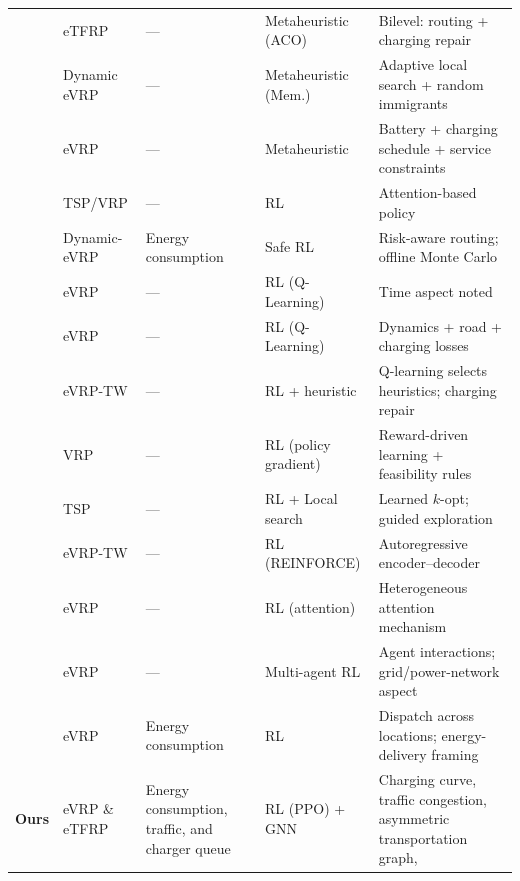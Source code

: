 \documentclass[a4paper,fleqn]{cas-sc}
\begin{document}
\begin{table}
\begin{tabular}{p{0.5cm}p{1.8cm}p{3.0cm}p{2.5cm}p{7cm}}
\cite{9409782} &
eTFRP &
--- &
Metaheuristic (ACO) &
Bilevel: routing + charging repair \\



\cite{https://doi.org/10.1155/2021/6635749} &
Dynamic eVRP &
--- &
Metaheuristic (Mem.) &
Adaptive local search + random immigrants \\


\cite{https://doi.org/10.1049/pel2.12555} &
eVRP &
--- &
Metaheuristic &
Battery + charging schedule + service constraints \\

\midrule
\cite{kool2018attention} &
TSP/VRP &
--- &
RL&
Attention-based policy \\



\cite{BASSO2022102496} &
Dynamic-eVRP &
Energy consumption &
Safe RL &
Risk-aware routing; offline Monte Carlo \\



\cite{lin2025} &
eVRP&
--- &
RL (Q-Learning) &
Time aspect noted \\

\cite{TANG2023121711} &
eVRP &
--- &
RL (Q-Learning)&
Dynamics + road + charging losses \\

\cite{lin2022} &
eVRP-TW &
--- &
RL + heuristic &
Q-learning selects heuristics; charging repair \\

\cite{NEURIPS2018_9fb4651c} &
VRP &
--- &
RL (policy gradient) &
Reward-driven learning + feasibility rules \\

\cite{NEURIPS2023_9bae70d3} &
TSP &
--- &
RL + Local search &
Learned $k$-opt; guided exploration \\

\cite{10608117} &
eVRP-TW &
--- &
RL (REINFORCE) &
Autoregressive encoder--decoder \\

\cite{11016767} &
eVRP &
--- &
RL (attention) &
Heterogeneous attention mechanism \\

\cite{10310266} &
eVRP &
--- &
Multi-agent RL &
Agent interactions; grid/power-network aspect \\

\cite{ALQAHTANI2022122626} &
eVRP &
Energy consumption &
RL&
Dispatch across locations; energy-delivery framing \\

\midrule
\textbf{Ours} &
eVRP \& eTFRP &
Energy consumption, traffic, and charger queue &
RL (PPO) + GNN &
Charging curve, traffic congestion, asymmetric transportation graph,  \\

\bottomrule
\end{tabular}
\end{table}
\end{document}
